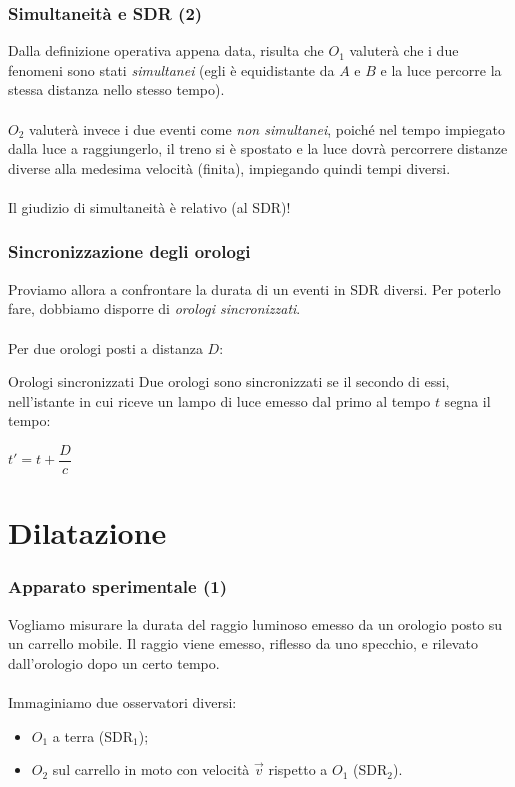 \documentclass[]{beamer}
\theoremstyle{plain}
\begin{document}
\begin{frame}
  \frametitle{Simultaneità e SDR (2)}
Dalla definizione operativa appena data, risulta che $ O_1 $ valuterà che i due fenomeni sono stati \emph{simultanei} (egli è equidistante da $ A $ e $ B $ e la luce percorre la stessa distanza nello stesso tempo).\\~\pause\\
$ O_2 $ valuterà invece i due eventi come \emph{non simultanei}, poiché nel tempo impiegato dalla luce a raggiungerlo, il treno si è spostato e la luce dovrà percorrere distanze diverse alla medesima velocità (finita), impiegando quindi tempi diversi.\\~\pause\\Il giudizio di simultaneità è relativo (al SDR)!
\end{frame}


\begin{frame}
  \frametitle{Sincronizzazione degli orologi}
  Proviamo allora a confrontare la durata di un eventi in SDR diversi. Per poterlo fare, dobbiamo disporre di \emph<1>{orologi sincronizzati}.\\~\pause\\Per due orologi posti a distanza $ D $:
  \begin{block}{Orologi sincronizzati}
    Due orologi sono sincronizzati se il secondo di essi, nell'istante in cui riceve un lampo di luce emesso dal primo al tempo $ t $ segna il tempo: \begin{center}
    $ t' = t + \dfrac{D}{c} $
    \end{center}
  \end{block}
\end{frame}


\section{Dilatazione}


\begin{frame}
  \frametitle{Apparato sperimentale (1)}
  Vogliamo misurare la durata del raggio luminoso emesso da un orologio posto su un carrello mobile. Il raggio viene emesso, riflesso da uno specchio, e rilevato dall'orologio dopo un certo tempo.\\~\pause\\Immaginiamo due osservatori diversi:
  \begin{itemize}
    \item $ O_1 $ a terra (SDR$ _1 $);
    \item $ O_2 $ sul carrello in moto con velocità $ \vec{v} $ rispetto a $ O_1 $ (SDR$ _2 $).
  \end{itemize}
\end{frame}
\end{document}
